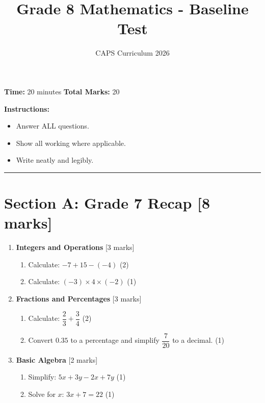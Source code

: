 \documentclass[12pt,a4paper]{article}
\title{\textbf{Grade 8 Mathematics - Baseline Test}}
\author{CAPS Curriculum 2026}
\date{}
\begin{document}
\maketitle

\vspace{0.5cm}
\noindent\textbf{Time:} 20 minutes \hfill \textbf{Total Marks:} 20

\vspace{0.3cm}
\noindent\textbf{Instructions:}
\begin{itemize}
    \item Answer ALL questions.
    \item Show all working where applicable.
    \item Write neatly and legibly.
\end{itemize}

\hrule
\vspace{0.5cm}

\section*{Section A: Grade 7 Recap [8 marks]}

\begin{enumerate}
    \item \textbf{Integers and Operations} \hfill [3 marks]
    
    \begin{enumerate}[label=(\alph*)]
        \item Calculate: $-7 + 15 - (-4)$ \hfill (2)
        \vspace{2cm}
        
        \item Calculate: $(-3) \times 4 \times (-2)$ \hfill (1)
    \end{enumerate}
    
    \item \textbf{Fractions and Percentages} \hfill [3 marks]
    
    \begin{enumerate}[label=(\alph*)]
        \item Calculate: $\dfrac{2}{3} + \dfrac{3}{4}$ \hfill (2)
        \vspace{2cm}
        
        \item Convert $0.35$ to a percentage and simplify $\dfrac{7}{20}$ to a decimal. \hfill (1)
    \end{enumerate}
    
    \item \textbf{Basic Algebra} \hfill [2 marks]
    
    \begin{enumerate}[label=(\alph*)]
        \item Simplify: $5x + 3y - 2x + 7y$ \hfill (1)
        \vspace{1.5cm}
        
        \item Solve for $x$: $3x + 7 = 22$ \hfill (1)
    \end{enumerate}
\end{enumerate}
\end{document}
